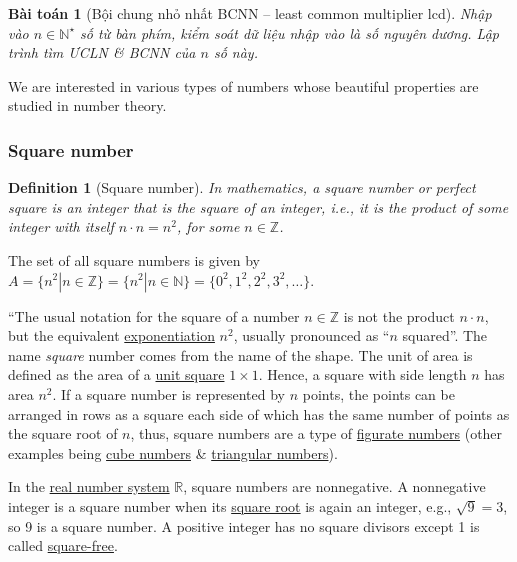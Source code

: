 \documentclass{article}
\newtheorem{baitoan}{Bài toán}
\newtheorem{definition}{Definition}
\begin{document}
\begin{baitoan}[Bội chung nhỏ nhất BCNN -- least common multiplier lcd]
	Nhập vào $n\in\mathbb{N}^\star$ số từ bàn phím, kiểm soát dữ liệu nhập vào là số nguyên dương. Lập trình tìm \emph{ƯCLN} \& \emph{BCNN} của $n$ số này.
\end{baitoan}

We are interested in various types of numbers whose beautiful properties are studied in number theory.

\subsubsection{Square number}

\begin{definition}[Square number]
	In mathematics, a \emph{square number} or \emph{perfect square} is an integer that is the square of an integer, i.e., it is the product of some integer with itself $n\cdot n = n^2$, for some $n\in\mathbb{Z}$. 
\end{definition}
The set of all square numbers is given by $A = \{n^2|n\in\mathbb{Z}\} = \{n^2|n\in\mathbb{N}\} = \{0^2,1^2,2^2,3^2,\ldots\}$.
 
``The usual notation for the square of a number $n\in\mathbb{Z}$ is not the product $n\cdot n$, but the equivalent \href{https://en.wikipedia.org/wiki/Exponentiation}{exponentiation} $n^2$, usually pronounced as ``$n$ squared''. The name \textit{square} number comes from the name of the shape. The unit of area is defined as the area of a \href{https://en.wikipedia.org/wiki/Unit_square}{unit square} $1\times1$. Hence, a square with side length $n$ has area $n^2$. If a square number is represented by $n$ points, the points can be arranged in rows as a square each side of which has the same number of points as the square root of $n$, thus, square numbers are a type of \href{https://en.wikipedia.org/wiki/Figurate_number}{figurate numbers} (other examples being \href{https://en.wikipedia.org/wiki/Cube_(algebra)}{cube numbers} \& \href{https://en.wikipedia.org/wiki/Triangular_numbers}{triangular numbers}).

In the \href{https://en.wikipedia.org/wiki/Real_number}{real number system} $\mathbb{R}$, square numbers are nonnegative. A nonnegative integer is a square number when its \href{https://en.wikipedia.org/wiki/Square_root}{square root} is again an integer, e.g., $\sqrt{9} = 3$, so 9 is a square number. A positive integer has no square divisors except 1 is called \href{https://en.wikipedia.org/wiki/Square-free_integer}{square-free}.
\end{document}
